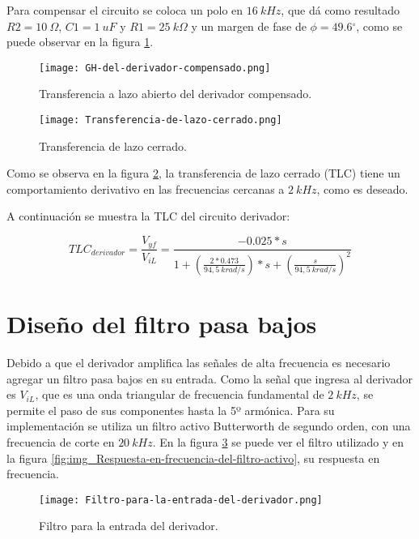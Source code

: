\noindent Para compensar el circuito se coloca un polo en $16 \:kHz$, que dá como resultado $R2=10\:\Omega$, $C1=1\:uF$ y $R1=25\: k\Omega$ y un margen de fase de $\phi =49.6{}^\circ $, como se puede observar en la figura \ref{fig:img_GH del derivador compensado}.

\begin{figure}[H]
	\centering
	\texttt{[image: GH-del-derivador-compensado.png]}
	\caption{Transferencia a lazo abierto del derivador compensado.}
	\label{fig:img_GH del derivador compensado}
\end{figure}

\begin{figure}[H]
	\centering
	\texttt{[image: Transferencia-de-lazo-cerrado.png]}
	\caption{Transferencia de lazo cerrado.}
	\label{fig:img_Transferencia-de-lazo-cerrado}
\end{figure}

\noindent Como se observa en la figura \ref{fig:img_Transferencia-de-lazo-cerrado}, la transferencia de lazo cerrado (TLC) tiene un comportamiento derivativo en las frecuencias cercanas a $2 \:kHz$, como es deseado.

\noindent A continuaci\'{o}n se muestra la TLC del circuito derivador:
 
\begin{equation} \label{eq_Vyf-lineal}
	{TLC}_{derivador}=\frac{V_{yf}}{V_{iL}}=\frac{-0.025*s}{1+(\frac{2*0.473}{94,5\ krad/s})*s+(\frac{s}{94,5\ krad/s})^2}
\end{equation} 

\section{Dise\~{n}o del filtro pasa bajos}

\noindent Debido a que el derivador amplifica las se\~{n}ales de alta frecuencia es necesario agregar un filtro pasa bajos en su entrada. Como la se\~{n}al que ingresa al derivador es $V_{iL}$, que es una onda triangular de frecuencia fundamental de $2\:kHz$, se permite el paso de sus componentes hasta la 5º arm\'{o}nica. Para su implementaci\'{o}n se utiliza un filtro activo Butterworth de segundo orden, con una frecuencia de corte en $20\:kHz$. En la figura  \ref{fig:img_Filtro-para-la-entrada-del-derivador} se puede ver el filtro utilizado y en la figura \ref{fig:img_Respuesta-en-frecuencia-del-filtro-activo}, su respuesta en frecuencia.

\begin{figure}[H]
	\centering
	\texttt{[image: Filtro-para-la-entrada-del-derivador.png]}
	\caption{Filtro para la entrada del derivador.}
	\label{fig:img_Filtro-para-la-entrada-del-derivador}
\end{figure}

